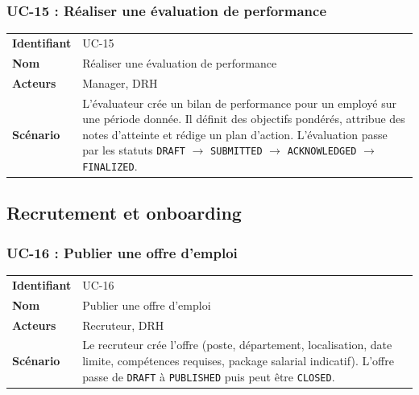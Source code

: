 \documentclass[a4paper,12pt,openany]{book}
\begin{document}
    \subsubsection*{UC-15 : Réaliser une évaluation de performance}
    \begin{table}[H]
        \centering
        \begin{tabularx}{\textwidth}{lX}
    \toprule
    \textbf{Identifiant} & UC-15 \\
    \textbf{Nom}         & Réaliser une évaluation de performance \\
    \textbf{Acteurs}     & Manager, DRH \\
    \midrule
    \textbf{Scénario} & L'évaluateur crée un bilan de performance pour un employé sur une période donnée. Il définit des objectifs pondérés, attribue des notes d'atteinte et rédige un plan d'action. L'évaluation passe par les statuts \texttt{DRAFT} $\rightarrow$ \texttt{SUBMITTED} $\rightarrow$ \texttt{ACKNOWLEDGED} $\rightarrow$ \texttt{FINALIZED}. \\
    \bottomrule
        \end{tabularx}
    \end{table}


    \subsection{Recrutement et onboarding}

    \subsubsection*{UC-16 : Publier une offre d'emploi}
    \begin{table}[H]
        \centering
        \begin{tabularx}{\textwidth}{lX}
    \toprule
    \textbf{Identifiant} & UC-16 \\
    \textbf{Nom}         & Publier une offre d'emploi \\
    \textbf{Acteurs}     & Recruteur, DRH \\
    \midrule
    \textbf{Scénario} & Le recruteur crée l'offre (poste, département, localisation, date limite, compétences requises, package salarial indicatif). L'offre passe de \texttt{DRAFT} à \texttt{PUBLISHED} puis peut être \texttt{CLOSED}. \\
    \bottomrule
        \end{tabularx}
    \end{table}
\end{document}
